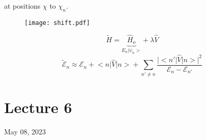 \documentclass[12pt,fancychapters]{report}
\numberwithin{equation}{section}
\begin{document}
at positions $\chi$ to $\chi_n$.
\begin{figure}[H]
  \centering
	\texttt{[image: shift.pdf]}
\end{figure}
\begin{equation*}
	\tilde{H} = \underbrace{\hat{H}_o}_{E_n\big|\psi_n\big>} + \lambda\hat{V}
\end{equation*}
\begin{equation*}
	\tilde{\mathcal{E}}_n \approx \mathcal{E}_n+\big<n\big|\hat{V}\big|n\big> + 
	\sum_{n'\neq n} \frac{\big|\big<n'\big|\hat{V}\big|n\big>\big|^2}{\mathcal{E}_n-\mathcal{E}_{n'}}
\end{equation*}
\newpage
\section{Lecture 6}
May 08, 2023
\end{document}
